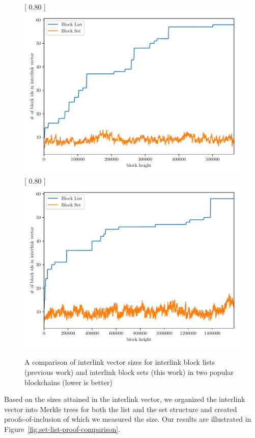 \begin{figure}
   \centering
   [
       0.80\textwidth
   ]
   {
       \includegraphics[width=0.85 \textwidth]
       {figures/interlink-vector-blocklist-vs-blockset.pdf}
   }
   \vskip 0pt
   [
       0.80\textwidth
   ]
   {
       \includegraphics[width=0.85 \textwidth]
       {figures/interlink-vector-blocklist-vs-blockset-litecoin.pdf}
   }
   \caption{A comparison of interlink vector sizes for interlink block lists (previous work) and interlink block sets (this work) in two popular blockchains (lower is better)}
   \label{fig.set-list-vector-comparison}
\end{figure}

Based on the sizes attained in the interlink vector, we organized the interlink
vector into Merkle trees for both the list and the set structure and created
proofs-of-inclusion of which we measured the size. Our results are illustrated
in Figure~\ref{fig.set-list-proof-comparison}.

